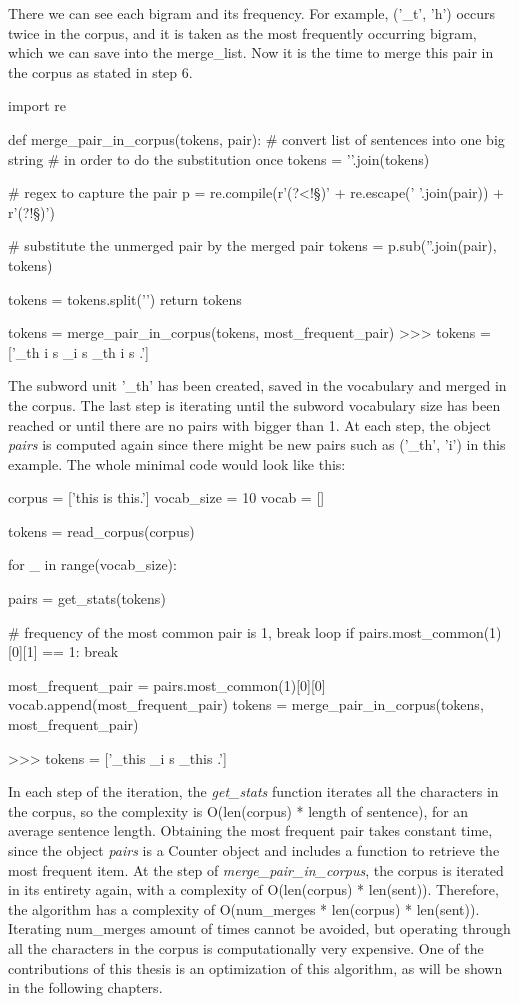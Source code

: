 There we can see each bigram and its frequency. For example, ('\_t', 'h') occurs twice in the corpus, and it is taken as the most frequently occurring bigram, which we can save into the merge\_list. Now it is the time to merge this pair in the corpus as stated in step 6.

\begin{python}
import re

def merge_pair_in_corpus(tokens, pair):
    # convert list of sentences into one big string
    # in order to do the substitution once
    tokens = '\n'.join(tokens)

    # regex to capture the pair
    p = re.compile(r'(?<!\S)' + re.escape(' '.join(pair)) + r'(?!\S)')

    # substitute the unmerged pair by the merged pair
    tokens = p.sub(''.join(pair), tokens)

    tokens = tokens.split('\n')
    return tokens

tokens = merge_pair_in_corpus(tokens, most_frequent_pair)
>>> tokens = ['_th i s _i s _th i s .']
\end{python}

The subword unit '\_th' has been created, saved in the vocabulary and merged in the corpus. The last step is iterating until the subword vocabulary size has been reached or until there are no pairs with bigger than 1. At each step, the object \emph{pairs} is computed again since there might be new pairs such as ('\_th', 'i') in this example. The whole minimal code would look like this:

\begin{python}
corpus = ['this is this.']
vocab_size = 10
vocab = []

tokens = read_corpus(corpus)

for _ in range(vocab_size):

    pairs = get_stats(tokens)

    # frequency of the most common pair is 1, break loop
    if pairs.most_common(1)[0][1] == 1:
        break

    most_frequent_pair = pairs.most_common(1)[0][0]
    vocab.append(most_frequent_pair)
    tokens = merge_pair_in_corpus(tokens, most_frequent_pair)

>>> tokens = ['_this _i s _this .']
\end{python}

In each step of the iteration, the \emph{get\_stats} function iterates all the characters in the corpus, so the complexity is O(len(corpus) * length of sentence), for an average sentence length. Obtaining the most frequent pair takes constant time, since the object \emph{pairs} is a Counter object and includes a function to retrieve the most frequent item. At the step of \emph{merge\_pair\_in\_corpus}, the corpus is iterated in its entirety again, with a complexity of O(len(corpus) * len(sent)). Therefore, the algorithm has a complexity of O(num\_merges * len(corpus) * len(sent)). Iterating num\_merges amount of times cannot be avoided, but operating through all the characters in the corpus is computationally very expensive. One of the contributions of this thesis is an optimization of this algorithm, as will be shown in the following chapters.

